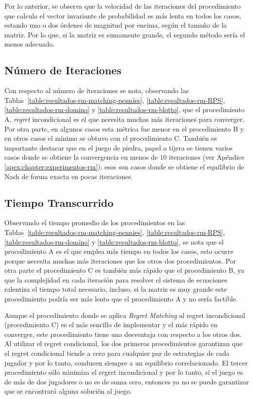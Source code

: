 Por lo anterior, se observa que la velocidad de las iteraciones del procedimiento que calcula el vector invariante de probabilidad es más lenta en todos los casos, estando uno o dos órdenes de magnitud por encima, según el tamaño de la matriz. Por lo que, si la matriz es sumamente grande, el segundo método sería el menos adecuado.

\subsection{Número de Iteraciones}

Con respecto al número de iteraciones se nota, observando las Tablas~\ref{table:resultados-rm-matching-pennies}, \ref{table:resultados-rm-RPS}, \ref{table:resultados-rm-domino} y \ref{table:resultados-rm-blotto}, que el procedimiento A, \textit{regret} incondicional es el que necesita muchas más iteraciones para converger. Por otra parte, en algunos casos esta métrica fue menor en el procedimiento B y en otros casos el mínimo se obtuvo con el procedimiento C. También es importante destacar que en el juego de piedra, papel o tijera se tienen varios casos donde se obtiene la convergencia en menos de $10$ iteraciones (ver Apéndice \ref{apex:chapter:experimentos-rm}); esos son casos donde se obtiene el equilibrio de Nash de forma exacta en pocas iteraciones.

\subsection{Tiempo Transcurrido}

Observando el tiempo promedio de los procedimientos en las Tablas~\ref{table:resultados-rm-matching-pennies}, \ref{table:resultados-rm-RPS}, \ref{table:resultados-rm-domino} y \ref{table:resultados-rm-blotto}, se nota que el procedimiento A es el que emplea más tiempo en todos los casos, esto ocurre porque necesita muchas más iteraciones que los otros dos procedimientos. Por otra parte el procedimiento C es también más rápido que el procedimiento B, ya que la complejidad en cada iteración para resolver el sistema de ecuaciones ralentiza el tiempo total necesario, incluso, si la matriz es muy grande este procedimiento podría ser más lento que el procedimiento A y no sería factible.

Aunque el procedimiento donde se aplica \textit{Regret Matching} al regret incondicional (procedimiento C) es el más sencillo de implementar y el más rápido en converger, este procedimiento tiene una desventaja con respecto a los otros dos. Al utilizar el regret condicional, los dos primeros procedimientos garantizan que el regret condicional tiende a cero para cualquier par de estrategias de cada jugador y por lo tanto, conducen siempre a un equilibrio correlacionado. El tercer procedimiento sólo minimiza el regret incondicional y por lo tanto, si el juego es de más de dos jugadores o no es de suma cero, entonces ya no se puede garantizar que se encontrará alguna solución al juego.
